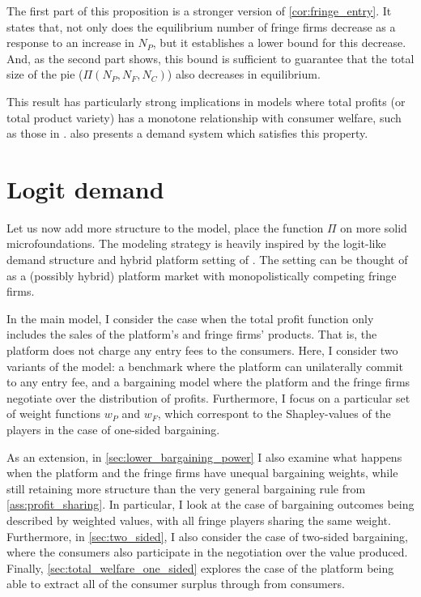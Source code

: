 \documentclass[a4paper]{article}
\begin{document}
The first part of this proposition is a stronger version of \cref{cor:fringe_entry}.
It states that, not only does the equilibrium number of fringe firms decrease as a response to an increase in $N_P$, but it establishes a lower bound for this decrease.
And, as the second part shows, this bound is sufficient to guarantee that the total size of the pie ($\Pi(N_P, N_F, N_C)$) also decreases in equilibrium.

This result has particularly strong implications in models where total profits (or total product variety) has a monotone relationship with consumer welfare, such as those in \textcite{anderson2020aggregative}.
 also presents a demand system which satisfies this property.


\section{Logit demand}
\label{sec:example}

Let us now add more structure to the model, place the function $\Pi$ on more solid microfoundations.
The modeling strategy is heavily inspired by the logit-like demand structure and hybrid platform setting of \textcite{anderson2021hybrid}.
The setting can be thought of as a (possibly hybrid) platform market with monopolistically competing fringe firms.

In the main model, I consider the case when the total profit function only includes the sales of the platform's and fringe firms' products.
That is, the platform does not charge any entry fees to the consumers.
Here, I consider two variants of the model: a benchmark where the platform can unilaterally commit to any entry fee, and a bargaining model where the platform and the fringe firms negotiate over the distribution of profits.
Furthermore, I focus on a particular set of weight functions $w_P$ and $w_F$, which correspont to the Shapley-values of the players in the case of one-sided bargaining.

As an extension, in \cref{sec:lower_bargaining_power} I also examine what happens when the platform and the fringe firms have unequal bargaining weights, while still retaining more structure than the very general bargaining rule from \cref{ass:profit_sharing}.
In particular, I look at the case of bargaining outcomes being described by weighted values, with all fringe players sharing the same weight.
Furthermore, in \cref{sec:two_sided}, I also consider the case of two-sided bargaining, where the consumers also participate in the negotiation over the value produced.
Finally, \cref{sec:total_welfare_one_sided} explores the case of the platform being able to extract all of the consumer surplus through from consumers.
\end{document}
